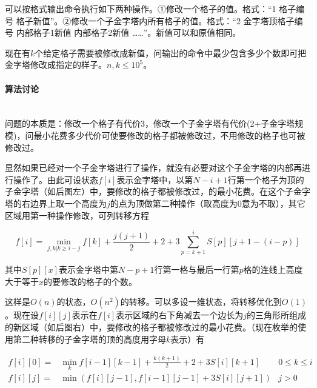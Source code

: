 \documentclass[UTF8]{ctexart}
\newcommand{\myparagraph}[1]{\paragraph{#1}\mbox{}\\}
\theoremstyle{nonumberplain}
\begin{document}
			可以按格式输出命令执行如下两种操作。①修改一个格子的值。格式：“1 格子编号 格子新值”。②修改一个子金字塔内所有格子的值。格式：“2 金字塔顶格子编号 内部格子1新值 内部格子2新值 ……”。新值可以和原值相同。
			
			现在有$k$个给定格子需要被修改成新值，问输出的命令中最少包含多少个数即可把金字塔修改成指定的样子。$n,k \leq 10^5$。
		
		\myparagraph{算法讨论}
		
			问题的本质是：修改一个格子有代价3，修改一个子金字塔有代价(2+子金字塔规模)，问最小花费多少代价可使要修改的格子都被修改过，不用修改的格子也可被修改过。
			
			显然如果已经对一个子金字塔进行了操作，就没有必要对这个子金字塔的内部再进行操作了。由此可设状态$f[i]$表示金字塔中，以第$N-i+1$行第一个格子为顶的子金字塔（如后图左）中，要修改的格子都被修改过，的最小花费。在这个子金字塔的右边界上取一个高度为$j$的点为顶做第二种操作（取高度为0意为不取），其它区域用第一种操作修改，可列转移方程
			
			$$ f[i]=\min_{j,k|k \geq i-j} f[k]+\frac{j(j+1)}{2}+2+3\sum_{p=k+1}^i S[p][j+1-(i-p)] $$
			
			其中$S[p][x]$表示金字塔中第$N-p+1$行第一格与最后一行第$p$格的连线上高度大于等于$x$的要修改的格子的个数。
			
			这样是$O(n)$的状态，$O(n^2)$的转移。可以多设一维状态，将转移优化到$O(1)$。现在设$f[i][j]$表示在$f[i]$表示区域的右下角减去一个边长为$j$的三角形所组成的新区域（如后图右）中，要修改的格子都被修改过的最小花费。（现在枚举的使用第二种转移的子金字塔的顶的高度用字母$k$表示）有
			
			$$ \begin{aligned}
				f[i][0] = & \min_k f[i-1][k-1]+\frac{k(k+1)}{2}+2+3 S[i][k+1] & 0 \leq k \leq i \\
				f[i][j] = & \min(f[i][j-1],f[i-1][j-1]+3 S[i][j+1]) & j>0
			\end{aligned}$$
			
\end{document}

